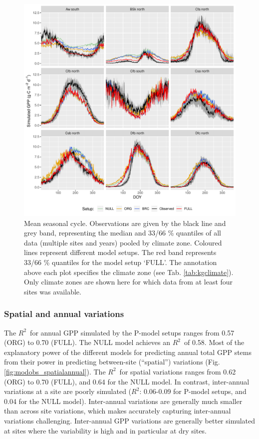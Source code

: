 \documentclass[gmd, manuscript]{copernicus}
\newcommand{\rsq}{$R^2$}
\begin{document}
 \begin{figure}[t]
\includegraphics[width=12cm]{fig/meandoy_byzone.pdf}
\caption{Mean seasonal cycle. Observations are given by the black line and grey band, representing the median and 33/66 \% quantiles of all data (multiple sites and years) pooled by climate zone. Coloured lines represent different model setups. The red band represents 33/66 \% quantiles for the model setup `FULL'. The annotation above each plot specifies the climate zone (see Tab. \ref{tab:kgclimate}). Only climate zones are shown here for which data from at least four sites was available.}
    \label{fig:season}
\end{figure}


\clearpage

\subsubsection{Spatial and annual variations}

The \rsq\ for annual GPP simulated by the P-model setups ranges from 0.57 (ORG) to 0.70 (FULL). The NULL model achieves an \rsq\ of 0.58. Most of the explanatory power of the different models for predicting annual total GPP stems from their power in predicting between-site (``spatial'') variations (Fig. \ref{fig:modobs_spatialannual}). The \rsq\ for spatial variations ranges from 0.62 (ORG) to 0.70 (FULL), and 0.64 for the NULL model. In contrast, inter-annual  variations at a site are poorly simulated (\rsq : 0.06-0.09 for P-model setups, and 0.04 for the NULL model). Inter-annual variations are generally much smaller than across site variations, which makes accurately capturing inter-annual variations challenging. Inter-annual GPP variations are generally better simulated at sites where the variability is high and in particular at dry sites. 
\end{document}
